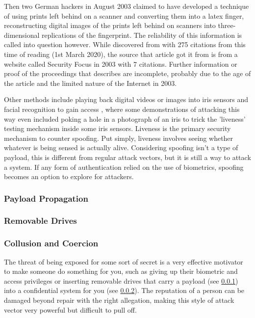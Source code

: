 \documentclass[a4paper, 11pt]{article}
\begin{document}
Then two German hackers in August 2003 claimed to have developed a technique of using prints left behind on a scanner and converting them into a latex finger, reconstructing digital images of the prints left behind on scanners into three-dimensional replications of the fingerprint. \cite{ref:biometricattackvectors,ref:harrison2003hackers} The reliability of this information is called into question however. While discovered from \cite{ref:biometricattackvectors} with 275 citations from this time of reading (1st March 2020), the source that article got it from \cite{ref:harrison2003hackers} is from a website called Security Focus in 2003 with 7 citations. Further information or proof of the proceedings that \cite{ref:harrison2003hackers} describes are incomplete, probably due to the age of the article and the limited nature of the Internet in 2003.

Other methods include playing back digital videos or images into iris sensors and facial recognition to gain access \cite{ref:bodybiometrie,ref:biometricattackvectors}, where some demonstrations of attacking this way even included poking a hole in a photograph of an iris to trick the 'liveness' testing mechanism inside some iris sensors. Liveness is the primary security mechanism to counter spoofing. Put simply, liveness involves seeing whether whatever is being sensed is actually alive. \cite{ref:biometricattackvectors} Considering spoofing isn't a type of payload, this is different from regular attack vectors, but it is still a way to attack a system. If any form of authentication relied on the use of biometrics, spoofing becomes an option to explore for attackers.

\subsubsection{Payload Propagation}
\label{sec:payloads}

\subsubsection{Removable Drives}
\label{sec:removabledrives}

\subsubsection{Collusion and Coercion}
\label{sec:coercion}
The threat of being exposed for some sort of secret is a very effective motivator to make someone do something for you, such as giving up their biometric and access privileges \cite{ref:biometricattackvectors} or inserting removable drives that carry a payload (see \ref{sec:payloads}) into a confidential system for you (see \ref{sec:removabledrives}). The reputation of a person can be damaged beyond repair with the right allegation, making this style of attack vector very powerful but difficult to pull off.
\end{document}
